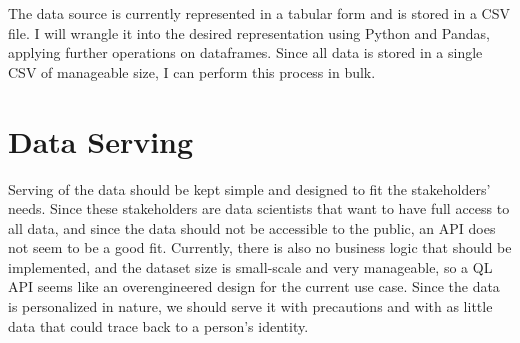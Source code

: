 \documentclass[sigconf, natbib=true]{acmart}
\begin{document}
The \citeauthor{untappd} data source is currently represented in a tabular form and is stored in a CSV file.
I will wrangle it into the desired representation using Python and Pandas, applying further operations on dataframes.
Since all data is stored in a single CSV of manageable size, I can perform this process in bulk.



\section{Data Serving}
Serving of the data should be kept simple and designed to fit the stakeholders' needs.
Since these stakeholders are data scientists that want to have full access to all data, and since the data should not be accessible to the public, an API does not seem to be a good fit.
Currently, there is also no business logic that should be implemented, and the dataset size is small-scale and very manageable, so a QL API seems like an overengineered design for the current use case.
Since the data is personalized in nature, we should serve it with precautions and with as little data that could trace back to a person's identity.
\end{document}
